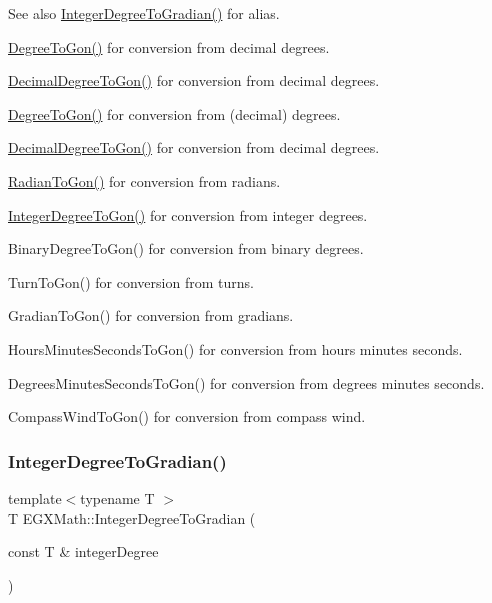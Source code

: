 \begin{DoxySeeAlso}{See also}
\mbox{\hyperlink{group___e_g_x_math-_angle_conversions-_integer_degree_ga47127467ff7a8ef57f6be9ce496a97df}{Integer\+Degree\+To\+Gradian()}} for alias. 

\mbox{\hyperlink{group___e_g_x_math-_angle_conversions-_degree_ga87c3fab0867021e5d2501197b4db6194}{Degree\+To\+Gon()}} for conversion from decimal degrees. 

\mbox{\hyperlink{group___e_g_x_math-_angle_conversions-_decimal_degree_gaeb333a1ad0aeb913c025fbd1be85fcb3}{Decimal\+Degree\+To\+Gon()}} for conversion from decimal degrees. 

\mbox{\hyperlink{group___e_g_x_math-_angle_conversions-_degree_ga87c3fab0867021e5d2501197b4db6194}{Degree\+To\+Gon()}} for conversion from (decimal) degrees. 

\mbox{\hyperlink{group___e_g_x_math-_angle_conversions-_decimal_degree_gaeb333a1ad0aeb913c025fbd1be85fcb3}{Decimal\+Degree\+To\+Gon()}} for conversion from decimal degrees. 

\mbox{\hyperlink{group___e_g_x_math-_angle_conversions-_radian_ga36912e5a810b64c271c4dafc17f4ca45}{Radian\+To\+Gon()}} for conversion from radians. 

\mbox{\hyperlink{group___e_g_x_math-_angle_conversions-_integer_degree_ga6e5be425c37ad27319f09329156c64bb}{Integer\+Degree\+To\+Gon()}} for conversion from integer degrees. 

Binary\+Degree\+To\+Gon() for conversion from binary degrees. 

Turn\+To\+Gon() for conversion from turns. 

Gradian\+To\+Gon() for conversion from gradians. 

Hours\+Minutes\+Seconds\+To\+Gon() for conversion from hours minutes seconds. 

Degrees\+Minutes\+Seconds\+To\+Gon() for conversion from degrees minutes seconds. 

Compass\+Wind\+To\+Gon() for conversion from compass wind. 
\end{DoxySeeAlso}
\mbox{\label{group___e_g_x_math-_angle_conversions-_integer_degree_ga47127467ff7a8ef57f6be9ce496a97df}} 
\subsubsection{\texorpdfstring{Integer\+Degree\+To\+Gradian()}{IntegerDegreeToGradian()}}
{\footnotesize\ttfamily template$<$typename T $>$ \\
T E\+G\+X\+Math\+::\+Integer\+Degree\+To\+Gradian (\begin{DoxyParamCaption}\item[{const T \&}]{integer\+Degree }\end{DoxyParamCaption})}



